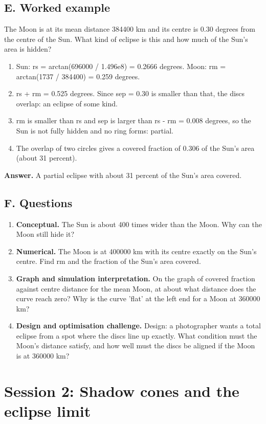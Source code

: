 \documentclass[11pt,a4paper]{article}
\begin{document}
\subsection*{E. Worked example}
The Moon is at its mean distance 384400 km and its centre is 0.30 degrees from the centre of the Sun. What kind of eclipse is this and how much of the Sun's area is hidden?
\begin{enumerate}[nosep]
\item Sun: rs = arctan(696000 / 1.496e8) = 0.2666 degrees. Moon: rm = arctan(1737 / 384400) = 0.259 degrees.
\item rs + rm = 0.525 degrees. Since sep = 0.30 is smaller than that, the discs overlap: an eclipse of some kind.
\item rm is smaller than rs and sep is larger than rs - rm = 0.008 degrees, so the Sun is not fully hidden and no ring forms: partial.
\item The overlap of two circles gives a covered fraction of 0.306 of the Sun's area (about 31 percent).
\end{enumerate}
\textbf{Answer.} A partial eclipse with about 31 percent of the Sun's area covered.

\subsection*{F. Questions}
\begin{enumerate}[nosep]
\item \textbf{Conceptual.} The Sun is about 400 times wider than the Moon. Why can the Moon still hide it?
\item \textbf{Numerical.} The Moon is at 400000 km with its centre exactly on the Sun's centre. Find rm and the fraction of the Sun's area covered.
\item \textbf{Graph and simulation interpretation.} On the graph of covered fraction against centre distance for the mean Moon, at about what distance does the curve reach zero? Why is the curve 'flat' at the left end for a Moon at 360000 km?
\item \textbf{Design and optimisation challenge.} Design: a photographer wants a total eclipse from a spot where the discs line up exactly. What condition must the Moon's distance satisfy, and how well must the discs be aligned if the Moon is at 360000 km?
\end{enumerate}

\section{Session 2: Shadow cones and the eclipse limit}
\end{document}
